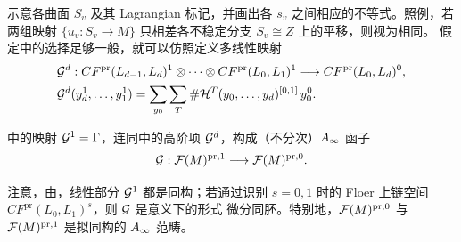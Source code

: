 示意各曲面 $S_v$ 及其 Lagrangian 标记，并画出各 $s_v$ 之间相应的不等式。照例，若两组映射 $\{u_v:S_v\to M\}$ 只相差各不稳定分支 $S_v\cong Z$ 上的平移，则视为相同。
假定中的选择足够一般，就可以仿照定义多线性映射
\begin{equation}\label{eq:10.17}
\begin{aligned}
&\mathcal G^d:CF^{\mathrm{pr}}(L_{d-1},L_d)^1\otimes\cdots\otimes CF^{\mathrm{pr}}(L_0,L_1)^1
\longrightarrow CF^{\mathrm{pr}}(L_0,L_d)^0,\\
&\mathcal G^d(y_d^1,\ldots,y_1^1)=\sum_{y_0}\sum_T\#\mathcal H^T(y_0,\ldots,y_d)^{[0,1]}\,y_0^0.
\end{aligned}
\end{equation}
\begin{proposition}\label{st:10.13}
中的映射 $\mathcal G^1=\Gamma$，连同中的高阶项 $\mathcal G^d$，构成（不分次）$A_\infty$ 函子
\[
\mathcal G:\mathcal F(M)^{\mathrm{pr},1}\longrightarrow\mathcal F(M)^{\mathrm{pr},0}.
\]
\end{proposition}
注意，由，线性部分 $\mathcal G^1$ 都是同构；若通过识别 $s=0,1$ 时的 Floer 上链空间 $CF^{\mathrm{pr}}(L_0,L_1)^s$，则 $\mathcal G$ 是意义下的形式
微分同胚。特别地，$\mathcal F(M)^{\mathrm{pr},0}$ 与 $\mathcal F(M)^{\mathrm{pr},1}$ 是拟同构的 $A_\infty$ 范畴。
